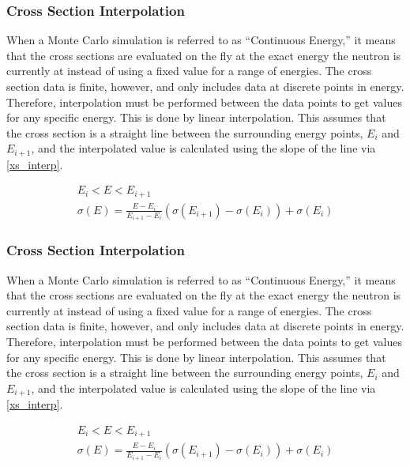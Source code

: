 \subsubsection{Cross Section Interpolation}

When a Monte Carlo simulation is referred to as ``Continuous Energy,'' it means that the cross sections are evaluated on the fly at the exact energy the neutron is currently at instead of using a fixed value for a range of energies.  The cross section data is finite, however, and only includes data at discrete points in energy.  Therefore, interpolation must be performed between the data points to get values for any specific energy.  This is done by linear interpolation.  This assumes that the cross section is a straight line between the surrounding energy points, $E_i$ and $E_{i+1}$, and the interpolated value is calculated using the slope of the line via \eqref{xs_interp}.

 \begin{equation}
\label{xs_interp}
\begin{gathered}
E_i < E < E_{i+1} \\
\sigma(E) = \frac{E-E_i}{E_{i+1}-E_i}(\sigma(E_{i+1})-\sigma(E_i)) + \sigma(E_i)
\end{gathered}
\end{equation}

\subsubsection{Cross Section Interpolation}

When a Monte Carlo simulation is referred to as ``Continuous Energy,'' it means that the cross sections are evaluated on the fly at the exact energy the neutron is currently at instead of using a fixed value for a range of energies.  The cross section data is finite, however, and only includes data at discrete points in energy.  Therefore, interpolation must be performed between the data points to get values for any specific energy.  This is done by linear interpolation.  This assumes that the cross section is a straight line between the surrounding energy points, $E_i$ and $E_{i+1}$, and the interpolated value is calculated using the slope of the line via \eqref{xs_interp}.

 \begin{equation}
\label{xs_interp}
\begin{gathered}
E_i < E < E_{i+1} \\
\sigma(E) = \frac{E-E_i}{E_{i+1}-E_i}(\sigma(E_{i+1})-\sigma(E_i)) + \sigma(E_i)
\end{gathered}
\end{equation}



